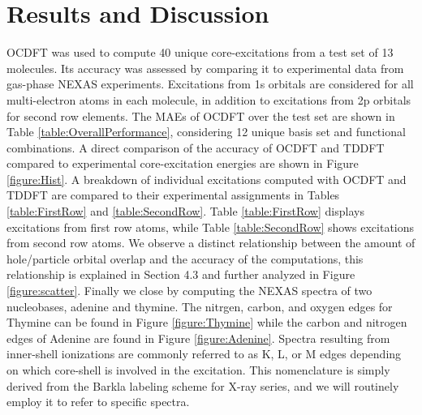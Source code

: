 \documentclass[12pt]{article}
\begin{document}
\section{Results and Discussion}
OCDFT was used to compute 40 unique core-excitations from a test set of 13 molecules. Its accuracy was assessed by comparing it to experimental data from gas-phase NEXAS experiments.\cite{puttner_vibrationally_1999,remmers_high-resolution_1992,chen_k-shell_1989,tronc_nitrogen_1980,tronc_carbon_1979,francis_studies_1994,adachi_vibronic_1999,hitchcock_k-shell_1979,domke_carbon_1990,nayandin_angle-resolved_2001,bodeur_single-and_1990} 
Excitations from 1s orbitals are considered for all multi-electron atoms in each molecule, in addition to excitations from 2p orbitals for second row elements. 
The MAEs of OCDFT over the test set are shown in Table \ref{table:OverallPerformance}, considering 12 unique basis set and functional combinations. A direct comparison of the accuracy of OCDFT and TDDFT compared to experimental core-excitation energies are shown in Figure \ref{figure:Hist}. A breakdown of individual excitations computed with OCDFT and TDDFT are compared to their experimental assignments in Tables \ref{table:FirstRow} and \ref{table:SecondRow}. Table \ref{table:FirstRow} displays excitations from first row atoms, while Table \ref{table:SecondRow} shows excitations from second row atoms. We observe a distinct relationship between the amount of hole/particle orbital overlap and the accuracy of the computations, this relationship is explained in Section 4.3 and further analyzed in Figure \ref{figure:scatter}. Finally we close by computing the NEXAS spectra of two nucleobases, adenine and thymine. The nitrgen, carbon, and oxygen edges for Thymine can be found in Figure \ref{figure:Thymine} while the carbon and nitrogen edges of Adenine are found in Figure \ref{figure:Adenine}. Spectra resulting from inner-shell ionizations are commonly referred to as K, L, or M edges depending on which core-shell is involved in the excitation. This nomenclature is simply derived from the Barkla labeling scheme for X-ray series, and we will routinely employ it to refer to specific spectra.
\end{document}
